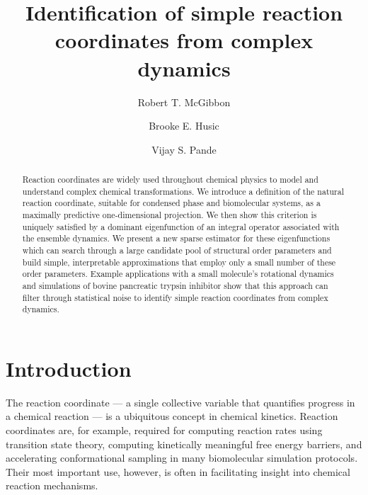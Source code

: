 \documentclass[aip, jcp, preprint, linenumbers, nofootinbib]{revtex4-1}
\begin{document}
\title{Identification of simple reaction coordinates from complex dynamics}
\author{Robert T. McGibbon}
\author{Brooke E. Husic}
\author{Vijay S. Pande}

\begin{abstract}
Reaction coordinates are widely used throughout chemical physics to model and understand complex chemical transformations. We introduce a definition of the natural reaction coordinate, suitable for condensed phase and biomolecular systems, as a maximally predictive one-dimensional projection. We then show this criterion is uniquely satisfied by a dominant eigenfunction of an integral operator associated with the ensemble dynamics. We present a new sparse estimator for these eigenfunctions which can search through a large candidate pool of structural order parameters and build simple, interpretable approximations that employ only a small number of these order parameters. Example applications with a small molecule's rotational dynamics and simulations of bovine pancreatic trypsin inhibitor show that this approach can filter through statistical noise to identify simple reaction coordinates from complex dynamics.
\end{abstract}
\maketitle


\section{Introduction}

The reaction coordinate --- a single collective variable that quantifies progress in a chemical reaction ---  is a ubiquitous concept in chemical kinetics.\cite{eyring1935activated, KRAMERS1940284} Reaction coordinates are, for example, required for computing reaction rates using transition state theory,\cite{eyring1935activated, KRAMERS1940284, truhlar1996current} computing kinetically meaningful free energy barriers,\cite{sichun2006effective} and accelerating conformational sampling in many biomolecular simulation protocols.\cite{Bernardi2015Enhanced, laio2002escaping, kastner2011umbrella, knight2009lambda, Torrie1977187} Their most important use, however, is often in facilitating insight into chemical reaction mechanisms.\cite{steinfeld1999chemical, RevModPhys.62.251, peters2015common}
\end{document}
